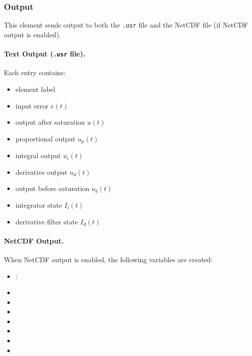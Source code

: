 \subsubsection{Output}

This element sends output to both the \texttt{.usr} file and the NetCDF file (if NetCDF output is enabled).

\paragraph{Text Output (\texttt{.usr} file).}
Each entry contains:
\begin{itemize}
\item[1)] element label
\item[2)] input error $e(t)$
\item[3)] output after saturation $u(t)$
\item[4)] proportional output $u_p(t)$
\item[5)] integral output $u_i(t)$
\item[6)] derivative output $u_d(t)$
\item[7)] output before saturation $u_b(t)$
\item[8)] integrator state $I_i(t)$
\item[9)] derivative filter state $I_d(t)$
\end{itemize}

\paragraph{NetCDF Output.}
When NetCDF output is enabled, the following variables are created:
\begin{itemize}
\item {}:
\item {}
\item {}
\item {}
\item {}
\item {}
\item {}
\item {}
\end{itemize}

